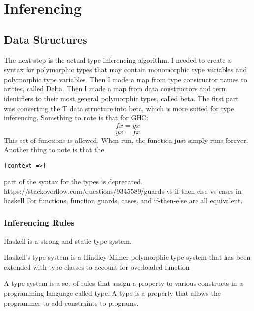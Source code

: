 \chapter{Inferencing}
\section{Data Structures}
The next step is the actual type inferencing algorithm.
	I needed to create a syntax for polymorphic types that may contain monomorphic type variables and polymorphic type variables.
	Then I made a map from type constructor names to arities, called Delta.
	Then I made a map from data constructors and term identifiers to their most general polymorphic types, called beta.
	The first part was converting the T data structure into beta, which is more suited for type inferencing.
	Something to note is that for GHC:
	$$
f x = y x
$$
$$
y x = f x
$$
This set of functions is allowed. When run, the function just simply runs forever.
	Another thing to note is that the
\begin{lstlisting}
[context =>]
\end{lstlisting}
part of the syntax for the types is deprecated.
https://stackoverflow.com/questions/9345589/guards-vs-if-then-else-vs-cases-in-haskell
For functions, function guards, cases, and if-then-else are all equivalent.

\subsection{Inferencing Rules}

\begin{prooftree}
\end{prooftree}

Haskell is a strong and static type system.

Haskell's type system is a Hindley-Milner polymorphic type system that has been extended with type classes to account for overloaded function

A type system is a set of rules that assign a property to various constructs in a programming language called type. A type is a property that allows the programmer to add constraints to programs.

